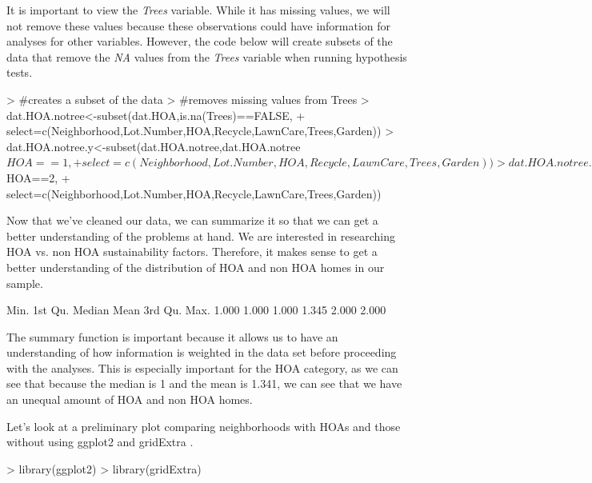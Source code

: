 \documentclass{article}
\begin{document}
It is important to view the \textit{Trees} variable. While it has missing values, we will not remove these values because these observations could have information for analyses for other variables. However, the code below will create subsets of the data that remove the \textit{NA} values from the \textit{Trees} variable when running hypothesis tests.

\begin{Schunk}
\begin{Sinput}
> #creates a subset of the data
> #removes missing values from Trees
> dat.HOA.notree<-subset(dat.HOA,is.na(Trees)==FALSE,
+                  select=c(Neighborhood,Lot.Number,HOA,Recycle,LawnCare,Trees,Garden)) 
> dat.HOA.notree.y<-subset(dat.HOA.notree,dat.HOA.notree$HOA==1,
+                  select=c(Neighborhood,Lot.Number,HOA,Recycle,LawnCare,Trees,Garden)) 
> dat.HOA.notree.n<-subset(dat.HOA.notree,dat.HOA.notree$HOA==2,
+                  select=c(Neighborhood,Lot.Number,HOA,Recycle,LawnCare,Trees,Garden)) 
\end{Sinput}
\end{Schunk}

Now that we've cleaned our data, we can summarize it so that we can get a better understanding of the problems at hand. We are interested in researching HOA vs. non HOA sustainability factors. Therefore, it makes sense to get a better understanding of the distribution of HOA and non HOA homes in our sample.

\begin{Schunk}
\begin{Soutput}
   Min. 1st Qu.  Median    Mean 3rd Qu.    Max. 
  1.000   1.000   1.000   1.345   2.000   2.000 
\end{Soutput}
\end{Schunk}

The summary function is important because it allows us to have an understanding of how information is weighted in the data set before proceeding with the analyses. This is especially important for the HOA category, as we can see that because the median is 1 and the mean is 1.341, we can see that we have an unequal amount of HOA and non HOA homes. 


Let's look at a preliminary plot comparing neighborhoods with HOAs and those without using ggplot2 \cite{ggplot2} and gridExtra \cite{gridExtra}.
\begin{Schunk}
\begin{Sinput}
> library(ggplot2)
> library(gridExtra)
\end{Sinput}
\end{Schunk}
\end{document}
